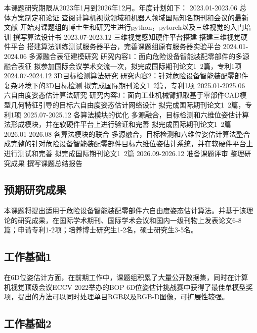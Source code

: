\documentclass[12pt]{article}
\begin{document}
本课题研究期限从2023年1月到2026年12月。年度计划如下：
2023.01-2023.06		总体方案制定和论证
查阅计算机视觉领域和机器人领域国际知名期刊和会议的最新文献
开始对课题组的博士生和研究生进行python，pytorch以及三维视觉的入门培训
撰写算法设计书
2023.07-2023.12		三维视觉感知硬件平台搭建
搭建三维视觉硬件平台
搭建算法训练测试服务器平台，完善课题组原有服务器实验平台
2024.01-2024.06		多源融合表征建模研究
研究内容1：面向危险设备智能装配零部件的多源融合表征
拟参加国际会议学术交流一次，拟完成国际期刊论文1~2篇，专利1项
2024.07-2024.12		3D目标检测算法研究
研究内容2：针对危险设备智能装配零部件复杂环境下的3D目标检测
拟完成国际期刊论文1~2篇，专利1项
2025.01-2025.06		六自由度姿态估计算法研究
研究内容3：面向工业机械臂抓取基于零部件CAD模型几何特征引导的目标六自由度姿态估计网络设计
拟完成国际期刊论文1~2篇，专利1项
2025.07-2025.12		各算法模块的优化
多源融合，目标检测和六维位姿估计算法形成模块，并在软硬件平台上进行验证和完善
拟完成国际期刊论文1~2篇
2026.01-2026.08		各算法模块的联合
多源融合，目标检测和六维位姿估计算法整合成完整的针对危险设备智能装配零部件目标六维位姿估计系统，并在软硬件平台上进行测试和完善
拟完成国际期刊论文1~2篇
2026.09-2026.12		准备课题评审
整理研究成果
撰写课题总结报告

\subsection{预期研究成果}

本课题将提出适用于危险设备智能装配零部件六自由度姿态估计算法。并基于该理论的研究成果，在国际学术期刊、国际学术会议和国内一级刊物上发表论文6-8篇；申请专利1-2项；培养博士研究生1-2名，硕士研究生3-5名。





\subsection{工作基础1}

在6D位姿估计方面，在前期工作中，课题组积累了大量公开数据集，同时在计算机视觉顶级会议ECCV 2022举办的BOP 6D位姿估计挑战赛中获得了最佳单模型奖项，提出的方法可以同时处理单目RGB以及RGB-D图像，可扩展性较强。

\subsection{工作基础2}
\end{document}
